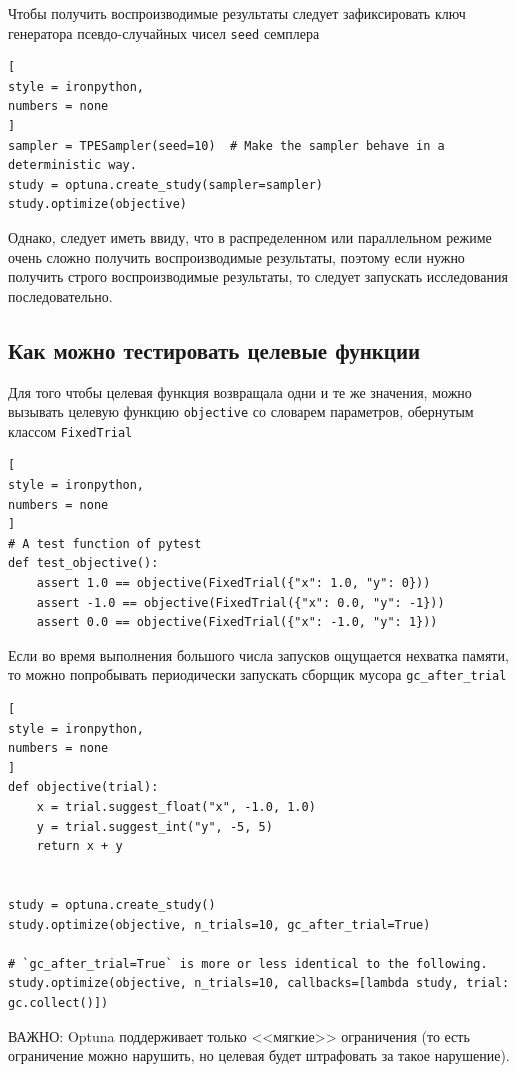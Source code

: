 \documentclass[%
	11pt,
	a4paper,
	utf8,
		]{article}
\begin{document}
Чтобы получить воспроизводимые результаты следует зафиксировать ключ генератора псевдо-случайных чисел \verb|seed| семплера
\begin{lstlisting}[
style = ironpython,
numbers = none
]
sampler = TPESampler(seed=10)  # Make the sampler behave in a deterministic way.
study = optuna.create_study(sampler=sampler)
study.optimize(objective)
\end{lstlisting}

Однако, следует иметь ввиду, что в распределенном или параллельном режиме очень сложно получить воспроизводимые результаты, поэтому если нужно получить строго воспроизводимые результаты, то следует запускать исследования последовательно.

\subsection{Как можно тестировать целевые функции}

Для того чтобы целевая функция возвращала одни и те же значения, можно вызывать целевую функцию \verb|objective| со словарем параметров, обернутым классом \verb|FixedTrial|
\begin{lstlisting}[
style = ironpython,
numbers = none
]
# A test function of pytest
def test_objective():
	assert 1.0 == objective(FixedTrial({"x": 1.0, "y": 0}))
	assert -1.0 == objective(FixedTrial({"x": 0.0, "y": -1}))
	assert 0.0 == objective(FixedTrial({"x": -1.0, "y": 1}))
\end{lstlisting}

Если во время выполнения большого числа запусков ощущается нехватка памяти, то можно попробывать периодически запускать сборщик мусора \verb|gc_after_trial|
\begin{lstlisting}[
style = ironpython,
numbers = none
]
def objective(trial):
	x = trial.suggest_float("x", -1.0, 1.0)
	y = trial.suggest_int("y", -5, 5)
	return x + y


study = optuna.create_study()
study.optimize(objective, n_trials=10, gc_after_trial=True)

# `gc_after_trial=True` is more or less identical to the following.
study.optimize(objective, n_trials=10, callbacks=[lambda study, trial: gc.collect()])
\end{lstlisting}

ВАЖНО: Optuna поддерживает только <<мягкие>> ограничения (то есть ограничение можно нарушить, но целевая будет штрафовать за такое нарушение).
\end{document}
